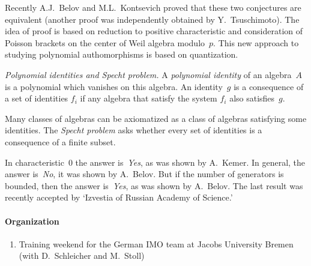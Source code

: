Recently A.J.~Belov and M.L.~Kontsevich proved that these two
conjectures are equivalent
(another proof was independently obtained by Y.~Tsuschimoto).
The idea of proof is based on reduction to positive characteristic and
consideration of Poisson brackets on the center of Weil algebra
modulo~$p$.
This new approach to studying polynomial authomorphisms is based on
quantization.
%
%

\smallskip

{\sl Polynomial identities and Specht problem.}
A {\sl polynomial identity} of an algebra~$A$ is a polynomial which vanishes on
this algebra. An identity~$g$ is a consequence of a set of identities ${f_i}$
if any algebra that satisfy the system ${f_i}$ also satisfies~$g$.

Many classes of algebras can be axiomatized as a class of algebras satisfying
some identities. The {\sl Specht problem} asks whether every set of identities
is a consequence of a finite subset.

In characteristic~0 the answer is~{\sl Yes}, as was shown by A.~Kemer. In
general, the answer is~{\sl No}, it was shown by A.~Belov. But if the number of
generators is bounded, then the answer is~{\sl Yes}, as was shown by A.~Belov.
The last result was recently accepted by `Izvestia of Russian Academy of Science.'

\paragraph{Organization}

\begin{enumerate}
\item Training weekend for the German IMO team at Jacobs University Bremen
      (with D.~Schleicher and M.~Stoll)
\end{enumerate}

